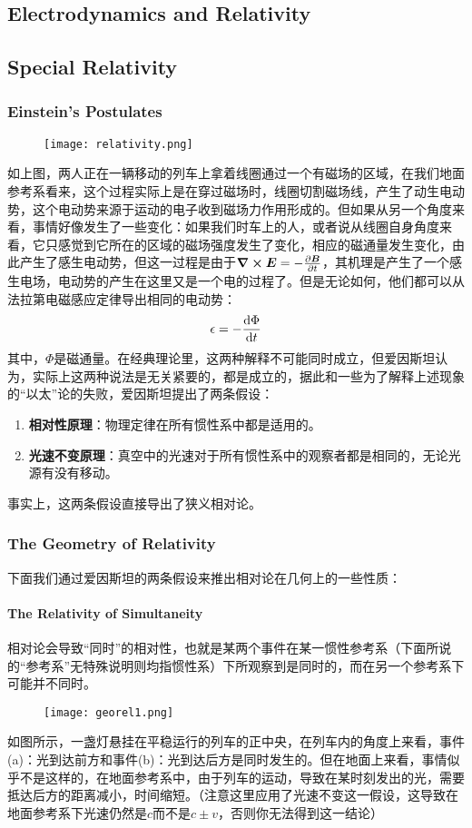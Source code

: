 \documentclass[14pt,oneside]{book}
\def \E{\vb*{E}}
\def \B{\vb*{B}}
\begin{document}
\begin{large}
\chapter{Electrodynamics and Relativity}

\section{Special Relativity}
\subsection{Einstein's Postulates}
\begin{figure}[H]
\centering
  \texttt{[image: relativity.png]}
\end{figure}
如上图，两人正在一辆移动的列车上拿着线圈通过一个有磁场的区域，在我们地面参考系看来，这个过程实际上是在穿过磁场时，线圈切割磁场线，产生了动生电动势，这个电动势来源于运动的电子收到磁场力作用形成的。但如果从另一个角度来看，事情好像发生了一些变化：如果我们时车上的人，或者说从线圈自身角度来看，它只感觉到它所在的区域的磁场强度发生了变化，相应的磁通量发生变化，由此产生了感生电动势，但这一过程是由于$\curl\E=-\pdv{\B}{t}$，其机理是产生了一个感生电场，电动势的产生在这里又是一个电的过程了。但是无论如何，他们都可以从法拉第电磁感应定律导出相同的电动势：
\begin{equation}
  \epsilon=-\dv{\Phi}{t}
\end{equation}
其中，$\Phi$是磁通量。在经典理论里，这两种解释不可能同时成立，但爱因斯坦认为，实际上这两种说法是无关紧要的，都是成立的，据此和一些为了解释上述现象的“以太”论的失败，爱因斯坦提出了两条假设：
\begin{enumerate}
  \item \textbf{相对性原理}：物理定律在所有惯性系中都是适用的。
  \item \textbf{光速不变原理}：真空中的光速对于所有惯性系中的观察者都是相同的，无论光源有没有移动。
\end{enumerate}
事实上，这两条假设直接导出了狭义相对论。

\subsection{The Geometry of Relativity}
下面我们通过爱因斯坦的两条假设来推出相对论在几何上的一些性质：
\subsubsection{The Relativity of Simultaneity}
相对论会导致“同时”的相对性，也就是某两个事件在某一惯性参考系（下面所说的“参考系”无特殊说明则均指惯性系）下所观察到是同时的，而在另一个参考系下可能并不同时。
\begin{figure}[H]
\centering
  \texttt{[image: georel1.png]}
\end{figure}
如图所示，一盏灯悬挂在平稳运行的列车的正中央，在列车内的角度上来看，事件(a)：光到达前方和事件(b)：光到达后方是同时发生的。但在地面上来看，事情似乎不是这样的，在地面参考系中，由于列车的运动，导致在某时刻发出的光，需要抵达后方的距离减小，时间缩短。（注意这里应用了光速不变这一假设，这导致在地面参考系下光速仍然是$c$而不是$c\pm v$，否则你无法得到这一结论）


\end{large}
\end{document}
